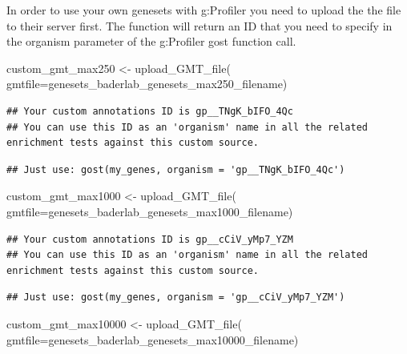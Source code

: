 \documentclass[
]{book}
\newenvironment{Shaded}{\begin{snugshade}}{\end{snugshade}}
\newcommand{\AttributeTok}[1]{\textcolor[rgb]{0.77,0.63,0.00}{#1}}
\newcommand{\FunctionTok}[1]{\textcolor[rgb]{0.00,0.00,0.00}{#1}}
\newcommand{\NormalTok}[1]{#1}
\newcommand{\OtherTok}[1]{\textcolor[rgb]{0.56,0.35,0.01}{#1}}
\begin{document}
In order to use your own genesets with g:Profiler you need to upload the the file to their server first. The function will return an ID that you need to specify in the organism parameter of the g:Profiler gost function call.

\begin{Shaded}
\begin{Highlighting}[]
\NormalTok{custom\_gmt\_max250 }\OtherTok{\textless{}{-}} \FunctionTok{upload\_GMT\_file}\NormalTok{(}
                        \AttributeTok{gmtfile=}\NormalTok{genesets\_baderlab\_genesets\_max250\_filename)}
\end{Highlighting}
\end{Shaded}

\begin{verbatim}
## Your custom annotations ID is gp__TNgK_bIFO_4Qc
## You can use this ID as an 'organism' name in all the related enrichment tests against this custom source.
\end{verbatim}

\begin{verbatim}
## Just use: gost(my_genes, organism = 'gp__TNgK_bIFO_4Qc')
\end{verbatim}

\begin{Shaded}
\begin{Highlighting}[]
\NormalTok{custom\_gmt\_max1000 }\OtherTok{\textless{}{-}} \FunctionTok{upload\_GMT\_file}\NormalTok{(}
                        \AttributeTok{gmtfile=}\NormalTok{genesets\_baderlab\_genesets\_max1000\_filename)}
\end{Highlighting}
\end{Shaded}

\begin{verbatim}
## Your custom annotations ID is gp__cCiV_yMp7_YZM
## You can use this ID as an 'organism' name in all the related enrichment tests against this custom source.
\end{verbatim}

\begin{verbatim}
## Just use: gost(my_genes, organism = 'gp__cCiV_yMp7_YZM')
\end{verbatim}

\begin{Shaded}
\begin{Highlighting}[]
\NormalTok{custom\_gmt\_max10000 }\OtherTok{\textless{}{-}} \FunctionTok{upload\_GMT\_file}\NormalTok{(}
                        \AttributeTok{gmtfile=}\NormalTok{genesets\_baderlab\_genesets\_max10000\_filename)}
\end{Highlighting}
\end{Shaded}
\end{document}

